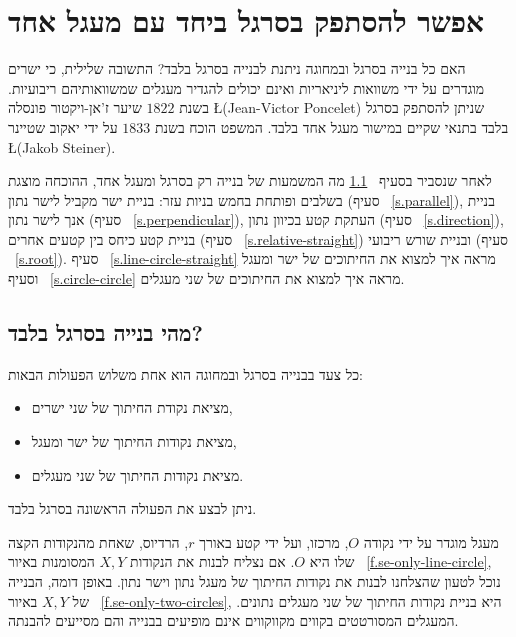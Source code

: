 
\chapter{אפשר להסתפק בסרגל ביחד עם מעגל אחד}\label{c.straightedge}


האם כל בנייה בסרגל ובמחוגה ניתנת לבנייה בסרגל בלבד? התשובה שלילית, כי ישרים מוגדרים על ידי משוואות ליניאריות ואינם יכולים להגדיר מעגלים שמשוואותיהם ריבועיות. בשנת
$1822$
שיער ז'אן-ויקטור פונסלה
\L{(Jean-Victor Poncelet)}
שניתן להסתפק בסרגל בלבד בתנאי שקיים במישור מעגל אחד בלבד. המשפט הוכח בשנת
$1833$
על ידי יאקוב שטיינר
\L{(Jakob Steiner)}.

לאחר שנסביר בסעיף%
~\ref{s.se-what}
מה המשמעות של בנייה רק בסרגל ומעגל אחד, ההוכחה מוצגת בשלבים ופותחת בחמש בניות עזר: בניית ישר מקביל לישר נתון (סעיף%
~\ref{s.parallel}),
בניית אנך לישר נתון (סעיף%
~\ref{s.perpendicular}),
העתקת קטע בכיוון נתון (סעיף%
~\ref{s.direction}), 
בניית קטע כיחס בין קטעים אחרים (סעיף%
~\ref{s.relative-straight})
ובניית שורש ריבועי (סעיף%
~\ref{s.root}).
סעיף%
~\ref{s.line-circle-straight}
מראה איך למצוא את החיתוכים של ישר ומעגל וסעיף%
~\ref{s.circle-circle}
מראה איך למצוא את החיתוכים של שני מעגלים.


\section{מהי בנייה בסרגל בלבד?}\label{s.se-what}

כל צעד בבנייה בסרגל ובמחוגה הוא אחת משלוש הפעולות הבאות:
\begin{itemize}
\setlength{\itemsep}{0pt}
\item
מציאת נקודת החיתוך של שני ישרים,
\item
מציאת נקודות החיתוך של ישר ומעגל,
\item
מציאת נקודות החיתוך של שני מעגלים.
\end{itemize}
ניתן לבצע את הפעולה הראשונה בסרגל בלבד.

מעגל מוגדר על ידי נקודה
$O$,
מרכזו, ועל ידי קטע באורך
$r$,
הרדיוס, שאחת מהנקודות הקצה שלו היא
$O$.
אם נצליח לבנות את הנקודות
$X,Y$
המסומנות באיור%
~\ref{f.se-only-line-circle},
נוכל לטעון שהצלחנו לבנות את נקודות החיתוך של מעגל נתון וישר נתון. באופן דומה, הבנייה של
$X,Y$
באיור%
~\ref{f.se-only-two-circles},
היא בניית נקודות החיתוך של שני מעגלים נתונים. המעגלים המסורטטים בקווים מקווקווים אינם מופיעים בבנייה והם מסייעים להבנתה.

